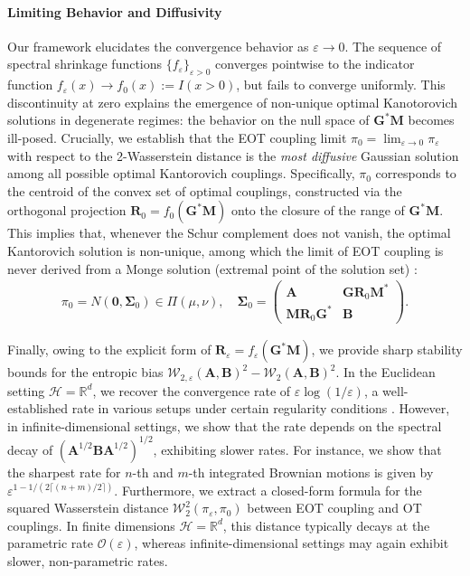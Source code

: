 \documentclass[noinfoline]{imsart}\setcounter{tocdepth}{2}
\renewcommand{\b}[1]{\mathbb{#1}}
\newcommand{\m}[1]{\mathbf{#1}}
\renewcommand{\c}[1]{\mathcal{#1}}
\theoremstyle{plain}
\begin{document}
\paragraph{Limiting Behavior and Diffusivity} 
Our framework elucidates the convergence behavior as
$\varepsilon \to 0$. The sequence of spectral shrinkage functions $\{f_{\varepsilon}\}_{\varepsilon > 0}$ converges pointwise to the indicator function $f_{\varepsilon}(x) \to f_{0}(x) := I(x > 0)$, but fails to converge uniformly. This discontinuity at zero explains the emergence of non-unique optimal Kanotorovich solutions in degenerate regimes: the behavior on the null space of $\m{G}^{*} \m{M}$ becomes ill-posed. Crucially, we establish that the EOT coupling limit $\pi_{0} = \lim_{\varepsilon \to 0} \pi_{\varepsilon}$ with respect to the 2-Wasserstein distance is the \emph{most diffusive} Gaussian solution among all possible optimal Kantorovich couplings. Specifically, $\pi_{0}$ corresponds to the centroid of the convex set of optimal couplings, constructed via the orthogonal projection $\m{R}_{0} = f_{0}(\m{G}^{*} \m{M})$ onto the closure of the range of $\m{G}^{*} \m{M}$.
This implies that, whenever the Schur complement does not vanish, the optimal Kantorovich solution is non-unique, among which the limit of EOT coupling is never derived from a Monge solution (extremal point of the solution set) \cite{leonard2012schrodinger, yun2025gaussian}:
\begin{align*}
    \pi_{0} = N(\m{0}, \m{\Sigma}_{0}) \in \Pi(\mu, \nu), \quad \m{\Sigma}_{0} = \left(
    \begin{array}{c|c}
    \m{A} & \m{G} \m{R}_{0} \m{M}^* \\
    \hline
    \m{M} \m{R}_{0} \m{G}^* & \m{B}
    \end{array}
    \right).
\end{align*}

Finally, owing to the explicit form of $\m{R}_{\varepsilon} = f_{\varepsilon} (\m{G}^{*} \m{M})$, we provide sharp stability bounds for the entropic bias $\c{W}_{2, \varepsilon} (\m{A}, \m{B})^{2} - \c{W}_{2} (\m{A}, \m{B})^{2}$. In the Euclidean setting $\c{H} = \b{R}^{d}$, we recover the convergence rate of $\varepsilon \log(1/\varepsilon)$, a well-established rate in various setups under certain regularity conditions \cite{leonard2012schrodinger, carlier2017convergence, nutz2022entropic, carlier2023convergence, eckstein2022quantitative, ghosal2022stability, janati2020entropic, goldfeld2020gaussian}. However, in infinite-dimensional settings, we show that the rate depends on the spectral decay of $(\m{A}^{1/2} \m{B} \m{A}^{1/2})^{1/2}$, exhibiting slower rates. For instance, we show that the sharpest rate for $n$-th and $m$-th integrated Brownian motions is given by $\varepsilon^{1-1/(2 \lceil (n+m)/2 \rceil)}$.
Furthermore, we extract a closed-form formula for the squared Wasserstein distance $\c{W}_{2}^{2}(\pi_{\varepsilon}, \pi_{0})$ between EOT coupling and OT couplings. In finite dimensions $\c{H} = \b{R}^{d}$, this distance typically decays at the parametric rate $\c{O}(\varepsilon)$, whereas infinite-dimensional settings may again exhibit slower, non-parametric rates.
\end{document}
